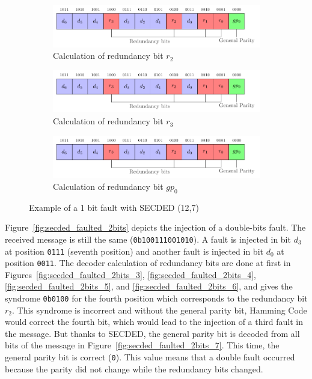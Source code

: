 \begin{figure}[ht]
    \hfill
    \begin{subfigure}[b]{0.49\textwidth}
        \includegraphics[width=\textwidth, page=9]{c5_countermeasures_dift/img/secded.pdf}
        \caption{Calculation of redundancy bit $r_2$}
        \label{fig:secded_faulted_1bit_5}
    \end{subfigure}
    \hfill
    \begin{subfigure}[b]{0.49\textwidth}
        \includegraphics[width=\textwidth, page=10]{c5_countermeasures_dift/img/secded.pdf}
        \caption{Calculation of redundancy bit $r_3$}
        \label{fig:secded_faulted_1bit_6}
    \end{subfigure}
    \hfill
    \begin{subfigure}[b]{0.49\textwidth}
        \includegraphics[width=\textwidth, page=11]{c5_countermeasures_dift/img/secded.pdf}
        \caption{Calculation of redundancy bit $gp_0$}
        \label{fig:secded_faulted_1bit_7}
    \end{subfigure}
    \caption{Example of a 1 bit fault with SECDED (12,7)}
    \label{fig:secded_faulted_1bit}
\end{figure}

Figure~\ref{fig:secded_faulted_2bits} depicts the injection of a double-bits fault. The received message is still the same (\texttt{0b100111001010}). A fault is injected in bit $d_3$ at position \texttt{0111} (seventh position) and another fault is injected in bit $d_0$ at position \texttt{0011}.
The decoder calculation of redundancy bits are done at first in Figures~\ref{fig:secded_faulted_2bits_3}, \ref{fig:secded_faulted_2bits_4}, \ref{fig:secded_faulted_2bits_5}, and \ref{fig:secded_faulted_2bits_6}, and gives the syndrome \texttt{0b0100} for the fourth position which corresponds to the redundancy bit $r_2$. This syndrome is incorrect and without the general parity bit, Hamming Code would correct the fourth bit, which would lead to the injection of a third fault in the message.
But thanks to SECDED, the general parity bit is decoded from all bits of the message in Figure~\ref{fig:secded_faulted_2bits_7}. This time, the general parity bit is correct (\texttt{0}). This value means that a double fault occurred because the parity did not change while the redundancy bits changed.

